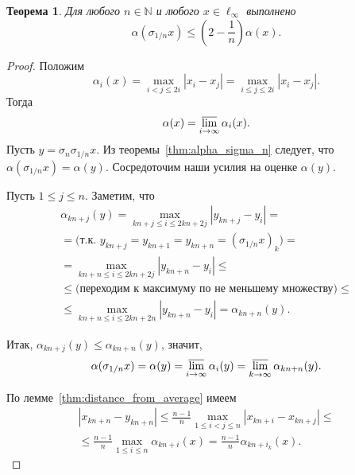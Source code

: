 \documentclass[a4paper,14pt]{article} %
\theoremstyle{plain}
\newtheorem{theorem}[lemma]{Теорема}
\begin{document}
\begin{theorem}
	\label{thm:alpha_sigma_1_n}
	Для любого $n\in\mathbb{N}$ и любого $x\in\ell_\infty$ выполнено
	\begin{equation}
		\alpha(\sigma_{1/n} x) \leq \left( 2- \frac{1}{n} \right) \alpha(x)
		.
	\end{equation}
\end{theorem}

\begin{proof}
	Положим
	\begin{equation}
		\alpha_i(x) =
		\max_{i<j\leqslant 2i} |x_i - x_j| =
		\max_{i\leqslant j\leqslant 2i} |x_i - x_j|
		.
	\end{equation}
	Тогда
	\begin{equation}
		\alpha(x) = \varlimsup_{i\to\infty} \alpha_i(x)
		.
	\end{equation}
	Пусть $y=\sigma_n \sigma_{1/n} x$.
	Из теоремы~\ref{thm:alpha_sigma_n} следует, что $\alpha(\sigma_{1/n} x)=\alpha(y)$.
	Сосредоточим наши усилия на оценке $\alpha(y)$.

	Пусть $1\leq j \leq n$.
	Заметим, что
	\begin{multline}
		\alpha_{kn+j}(y)
		=
		\max_{kn+j \leq i \leq 2kn+2j } |y_{kn+j} - y_i|
		=
		\\=
		\mbox{(т.к. $y_{kn+j}=y_{kn+1}=y_{kn+n} = (\sigma_{1/n}x)_k$)}
		=
		\\=
		\max_{kn+n \leq i \leq 2kn+2j } |y_{kn+n} - y_i|
		\leq
		\\\leq
		\mbox{(переходим к максимуму по не меньшему множеству)}
		\leq
		\\\leq
		\max_{kn+n \leq i \leq 2kn+2n } |y_{kn+n} - y_i|
		=
		\alpha_{kn+n}(y)
		.
	\end{multline}

	Итак, $\alpha_{kn+j}(y) \leq \alpha_{kn+n}(y)$,
	значит,
	\begin{equation}
		\label{eq:alpha_sigma_1_n_subseq_limsup}
		\alpha(\sigma_{1/n}x) = \alpha(y) = \varlimsup_{i\to\infty} \alpha_i(y)
		=
		\varlimsup_{k\to\infty} \alpha_{kn+n}(y)
		.
	\end{equation}

	По лемме~\ref{thm:distance_from_average} имеем
	\begin{multline}
		\label{eq:alpha_sigma_1_n_distance}
		|x_{kn+n}-y_{kn+n}|
		\leq
		\frac{n-1}{n}\max_{1\leq i<j \leq n}|x_{kn+i}-x_{kn+j}|
		\leq
		\\\leq
		\frac{n-1}{n} \max_{1\leq i \leq n} \alpha_{kn+i}(x)
		=
		\frac{n-1}{n}\alpha_{kn+i_k}(x)
		.
	\end{multline}


\end{proof}
\end{document}
